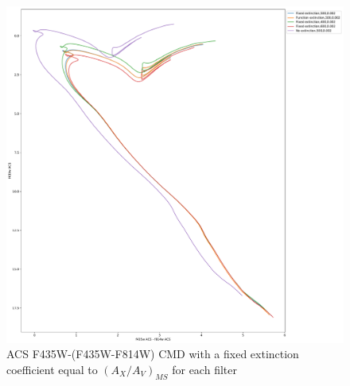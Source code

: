 \documentclass[12pt, a4paper]{report}
\begin{document}
\begin{figure}[h]
\begin{center}
\includegraphics[scale=0.3]{../basti_isochrones_10_13Gyr/Extinction_T5k_FeH0fix_func_f435wACS_f435wACSmf814wACS_500_400_600_Myr_FeH_0p002_ref_noext_Av_1p0.pdf}
\caption{ACS F435W-(F435W-F814W) CMD with a fixed extinction coefficient equal to $(A_{X}/A_{V})_{MS}$ for each filter}
\label{acs_isoc_T5k}
\end{center}
\end{figure}
\end{document}
